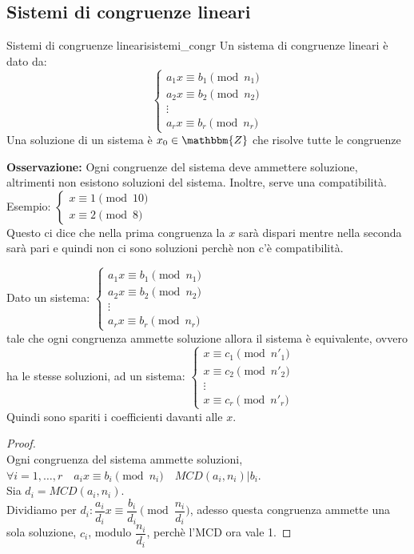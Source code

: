 \documentclass[12pt, letterpaper]{report}
\newcounter{theorem}
\newcounter{definition}
\newcommand{\nmu}{}
\begin{document}
		\subsection{Sistemi di congruenze lineari}
		\begin{definition}{\nmu Sistemi di congruenze lineari}{sistemi_congr}
			Un sistema di congruenze lineari è dato da:
			\[
			\begin{cases}
				a_1x \equiv b_1 \pmod{n_1} \\
				a_2x \equiv b_2 \pmod{n_2} \\
				\vdots  \\
				a_rx \equiv b_r \pmod{n_r}
			\end{cases}
			\]
			Una soluzione di un sistema è $x_0 \in \mathbbm{Z}$ che risolve tutte le congruenze
		\end{definition}
		\textbf{Osservazione:} Ogni congruenze del sistema deve ammettere soluzione, altrimenti non esistono soluzioni del sistema. Inoltre, serve una compatibilità. Esempio: $\begin{cases}
			x \equiv 1 \pmod{10}  \\
			x \equiv 2 \pmod{8}
		\end{cases}$ \\
		Questo ci dice che nella prima congruenza la $x$ sarà dispari mentre nella seconda sarà pari e quindi non ci sono soluzioni perchè non c'è compatibilità.
		\begin{theorem}{}{}
						Dato un sistema:
			$\begin{cases}
				a_1x \equiv b_1 \pmod{n_1} \\
				a_2x \equiv b_2 \pmod{n_2} \\
				\vdots \\
				a_rx \equiv b_r \pmod{n_r}
			\end{cases}$ \\
			tale che ogni congruenza ammette soluzione allora il sistema è equivalente, ovvero ha le stesse soluzioni, ad un sistema: $\begin{cases}
				x \equiv c_1 \pmod{n'_1} \\
				x \equiv c_2 \pmod{n'_2} \\
				\vdots \\
				x \equiv c_r \pmod{n'_r}
			\end{cases}$ \\
			Quindi sono spariti i coefficienti davanti alle $x$.
			\begin{proof} \quad \\
				Ogni congruenza del sistema ammette soluzioni, $\forall i = 1, \dots, r \quad a_ix \equiv b_i \pmod{n_i} \quad MCD(a_i, n_i) | b_i$.\\
				Sia $d_i = MCD(a_i, n_i)$. \\
				Dividiamo per $d_i: \dfrac{a_i}{d_i}x \equiv \dfrac{b_i}{d_i} \pmod{\dfrac{n_i}{d_i}}$, adesso questa congruenza ammette una sola soluzione, $c_i$, modulo $\dfrac{n_i}{d_i}$, perchè l'MCD ora vale 1.
			\end{proof}
		\end{theorem}
\end{document}
